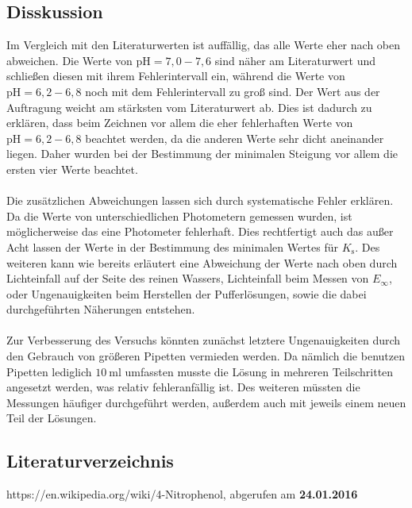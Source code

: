 \documentclass[12pt,a4paper,titlepage,headinclude,bibtotoc]{scrartcl}
\begin{document}
\subsection{Disskussion}
Im Vergleich mit den Literaturwerten ist auffällig, das alle Werte eher nach oben abweichen. Die Werte von $ \mathrm{pH} = 7,0- 7,6$ sind näher am Literaturwert und schließen diesen mit ihrem Fehlerintervall ein, während die Werte von $ \mathrm{pH} = 6,2- 6,8$ noch mit dem Fehlerintervall zu groß sind. Der Wert aus der Auftragung weicht am stärksten vom Literaturwert ab. Dies ist dadurch zu erklären, dass beim Zeichnen vor allem die eher fehlerhaften Werte von $ \mathrm{pH} = 6,2- 6,8$ beachtet werden, da die anderen Werte sehr dicht aneinander liegen. Daher wurden bei der Bestimmung der minimalen Steigung vor allem die ersten vier Werte beachtet.\\\\
Die zusätzlichen Abweichungen lassen sich durch systematische Fehler erklären. Da die Werte von unterschiedlichen Photometern gemessen wurden, ist möglicherweise das eine Photometer fehlerhaft. Dies rechtfertigt auch das außer Acht lassen der Werte in der Bestimmung des minimalen Wertes für $K_{\mathrm{s}}$. Des weiteren  kann wie bereits erläutert eine Abweichung der Werte nach oben durch Lichteinfall auf der Seite des reinen Wassers, Lichteinfall beim Messen von $E_{\infty}$, oder Ungenauigkeiten beim Herstellen der Pufferlösungen, sowie die dabei durchgeführten Näherungen entstehen.\\\\
Zur Verbesserung des Versuchs könnten zunächst letztere Ungenauigkeiten durch den Gebrauch von größeren Pipetten vermieden werden. Da nämlich die benutzen Pipetten lediglich $10{~} \mathrm{ml}$ umfassten musste die Lösung in mehreren Teilschritten angesetzt werden, was relativ fehleranfällig ist. Des weiteren müssten die Messungen häufiger durchgeführt werden, außerdem auch mit jeweils einem neuen Teil der Lösungen.
 
\newpage
\subsection{Literaturverzeichnis}
https://en.wikipedia.org/wiki/4-Nitrophenol, abgerufen am \textbf{24.01.2016}
\end{document}
